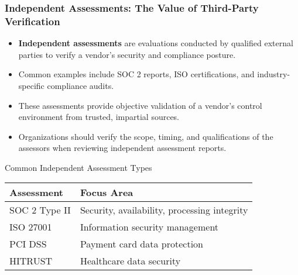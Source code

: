 \documentclass{beamer}
\begin{document}
\begin{frame}
    \frametitle{Independent Assessments: The Value of Third-Party Verification}
    
    \begin{itemize}
        \item \textbf{Independent assessments} are evaluations conducted by qualified external parties to verify a vendor's security and compliance posture.
        \item Common examples include SOC 2 reports, ISO certifications, and industry-specific compliance audits.
        \item These assessments provide objective validation of a vendor's control environment from trusted, impartial sources.
        \item Organizations should verify the scope, timing, and qualifications of the assessors when reviewing independent assessment reports.
    \end{itemize}
    
    \begin{block}{Common Independent Assessment Types}
        \scriptsize
        \begin{tabular}{ll}
            \textbf{Assessment} & \textbf{Focus Area} \\
            \hline
            SOC 2 Type II & Security, availability, processing integrity \\
            ISO 27001 & Information security management \\
            PCI DSS & Payment card data protection \\
            HITRUST & Healthcare data security \\
        \end{tabular}
    \end{block}
\end{frame}
\end{document}
